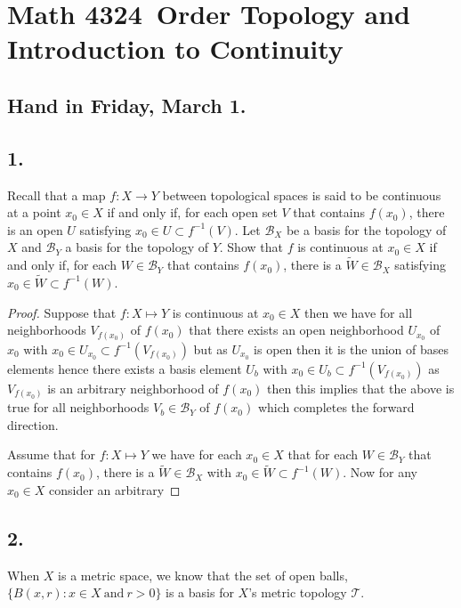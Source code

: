 \documentclass{amsart}
\theoremstyle{plain}
\theoremstyle{definition}
\theoremstyle{remark}
\begin{document}
\section*{Math 4324\  Order Topology and Introduction to Continuity } 

\subsection*{Hand in Friday, March 1.} 




\vspace{.15in}
\noindent
\subsection*{1.}  Recall that a map $f : X \rightarrow Y$ between topological spaces is said to be continuous at a point $x_0 \in X$ if and only if, for each open set $V$ that contains $f(x_0)$, there is an open $U$ satisfying $x_0 \in U \subset f^{-1}(V)$. Let $\mathcal B _X$ be a basis for the topology of $X$ and $\mathcal B _Y$ a basis for the topology of $Y$. Show that $f$ is continuous at $x_0 \in X$ if and only if, for each $W\in \mathcal B _Y$ that contains $f(x_0)$, there is a $\widetilde{W} \in \mathcal B _X$ satisfying $x_0 \in \widetilde{W} \subset f^{-1} (W)$. 


\begin{proof}
    Suppose that $f:X\mapsto Y$ is continuous at $x_0\in X$ then we have for all neighborhoods $V_{f(x_0)}$ of $f(x_0)$ that there exists an open neighborhood $U_{x_0}$ of $x_0$ with $x_0\in U_{x_0}\subset f^{-1}(V_{f(x_0)})$ but as $U_{x_0}$ is open then it is the union of bases elements hence there exists a basis element $U_{b}$ with $x_0\in U_{b}\subset f^{-1}(V_{f(x_0)})$ as $V_{f(x_0)}$ is an arbitrary neighborhood of $f(x_0)$ then this implies that the above is true for all neighborhoods $V_{b}\in \mathcal B_Y$ of $f(x_0)$ which completes the forward direction. 

    Assume that for $f:X\mapsto Y$ we have for each $x_0\in X$ that for each $W\in \mathcal B_Y$ that contains $f(x_0)$, there is a $\widetilde{W}\in \mathcal B_X$ with $x_0\in \widetilde{W} \subset f^{-1}(W)$. Now for any $x_0\in X$ consider an arbitrary 

\end{proof}


\vspace{.15in}

\noindent
\subsection*{2.}  When $X$ is a metric space, we know that the set of open balls, $\{ B(x,r) : x\in X \ \mbox{and} \ r>0\}$ is a basis for $X$'s metric topology $\mathcal T$. 
\end{document}
